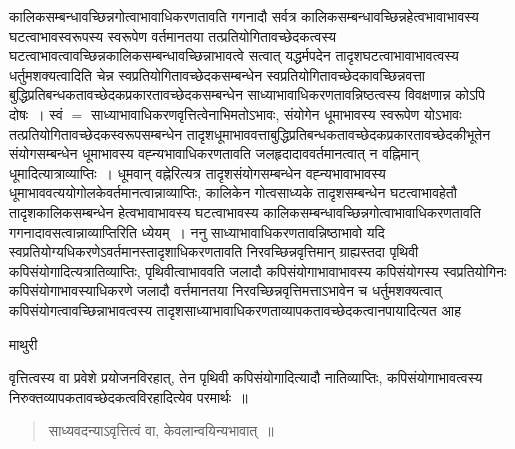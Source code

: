 \documentclass[10pt, openany]{book}
\begin{document}
{कालिकसम्बन्धावच्छिन्नगोत्वाभावाधिकरणतावति गगनादौ सर्वत्र कालिकसम्बन्धावच्छिन्नहेत्वभावाभावस्य घटत्वाभावस्वरूपस्य स्वरूपेण वर्तमानतया तत्प्रतियोगितावच्छेदकत्वस्य घटत्वाभावत्वावच्छिन्नकालिकसम्बन्धावच्छिन्नाभावत्वे सत्वात् यद्धर्मपदेन तादृशघटत्वाभावाभावत्वस्य धर्तुमशक्यत्वादिति चेन्न स्वप्रतियोगितावच्छेदकसम्बन्धेन  स्वप्रतियोगितावच्छेदकावच्छिन्नवत्ता बुद्धिप्रतिबन्धकतावच्छेदकप्रकारतावच्छेदकसम्बन्धेन साध्याभावाधिकरणतावन्निष्ठत्वस्य विवक्षणान्न कोऽपि दोषः~। स्वं $=$  साध्याभावाधिकरणवृत्तित्वेनाभिमतोऽभावः, संयोगेन धूमाभावस्य स्वरूपेण योऽभावः तत्प्रतियोगितावच्छेदकस्वरूपसम्बन्धेन
तादृशधूमाभाववत्ताबुद्धिप्रतिबन्धकतावच्छेदकप्रकारतावच्छेदकीभूतेन संयोगसम्बन्धेन धूमाभावस्य वह्न्यभावाधिकरणतावति जलहृदादाववर्तमानत्वात् न वह्निमान् धूमादित्यात्राव्याप्तिः~। धूमवान् वह्नेरित्यत्र तादृशसंयोगसम्बन्धेन वह्न्यभावाभावस्य धूमाभाववत्ययोगोलकेवर्तमानत्वान्नाव्याप्तिः, कालिकेन गोत्वसाध्यके तादृशसम्बन्धेन
घटत्वाभावहेतौ तादृशकालिकसम्बन्धेन हेत्वभावाभावस्य घटत्वाभावस्य कालिकसम्बन्धावच्छिन्नगोत्वाभावाधिकरणतावति गगनादावसत्वान्नाव्याप्तिरिति ध्येयम्~।
ननु साध्याभावाधिकरणतावन्निष्ठाभावो यदि स्वप्रतियोग्यधिकरणेऽवर्तमानस्तादृशाधिकरणतावति निरवच्छिन्नवृत्तिमान् ग्राह्यस्तदा पृथिवी कपिसंयोगादित्यत्रातिव्याप्तिः, पृथिवीत्वाभाववति जलादौ कपिसंयोगाभावाभावस्य कपिसंयोगस्य स्वप्रतियोगिनः कपिसंयोगाभावस्याधिकरणे जलादौ वर्त्तमानतया निरवच्छिन्नवृत्तिमत्ताऽभावेन च धर्तुमशक्यत्वात् कपिसंयोगत्वावच्छिन्नाभावत्वस्य तादृशसाध्याभावाधिकरणताव्यापकतावच्छेदकत्वानपायादित्यत आह
\newpage
\begin{center}  माथुरी  \end{center}
{\la वृत्तित्वस्य वा प्रवेशे प्रयोजनविरहात्, तेन पृथिवी कपिसंयोगादित्यादौ नातिव्याप्तिः, कपिसंयोगाभावत्वस्य निरुक्तव्यापकतावच्छेदकत्वविरहादित्येव परमार्थः~॥
\begin{quote}
\vpc
साध्यवदन्याऽवृत्तित्वं वा, केवलान्वयिन्यभावात्~॥~ 
\end{quote}

}}
\end{document}
